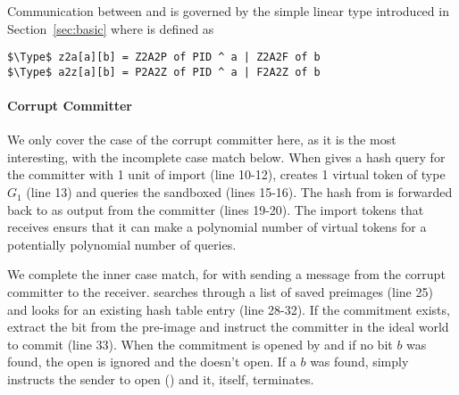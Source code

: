 Communication between \Z and \A is governed by the simple linear type \inline{comm[G][Z2A[2p][2f]} introduced in Section~\ref{sec:basic} where  is defined as 
\begin{lstlisting}[basicstyle=\footnotesize\BeraMonottFamily, mathescape]
$\Type$ z2a[a][b] = Z2A2P of PID ^ a | Z2A2F of b 
$\Type$ a2z[a][b] = P2A2Z of PID ^ a | F2A2Z of b
\end{lstlisting}

\paragraph*{\textbf{Corrupt Committer}}
We only cover the case of the corrupt committer here, as it is the most interesting, with the incomplete case match below.
When \Z gives \simcom a hash query for the committer with 1 unit of import (line 10-12), \simcom creates 1 virtual token of type $G_1$ (line 13) and queries the sandboxed \Fro (lines 15-16).  
The hash from \Fro is forwarded back to \Z as output  from the committer (lines 19-20).
The import tokens that \simcom receives ensurs that it can make a polynomial number of virtual tokens for a potentially polynomial number of queries. 

We complete the inner case match, for  with \Z sending a message from the corrupt committer to the receiver.
\simcom searches through a list of saved preimages  (line 25) and looks for an existing hash table entry (line 28-32). 
If the commitment exists, extract the bit from the pre-image and instruct the committer in the ideal world to commit (line 33).
When the commitment is opened by \Z and if no bit $b$ was found, the open is ignored and the \Fcom doesn't open.
If a $b$ was found, \simcom simply instructs the sender to open () and it, itself, terminates.  

